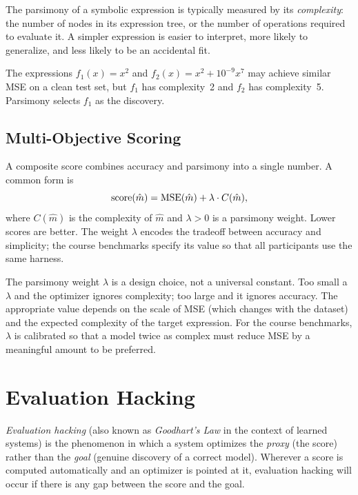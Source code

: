 The parsimony of a symbolic expression is typically measured by its \emph{complexity}: the number of nodes in its expression tree, or the number of operations required to evaluate it.
A simpler expression is easier to interpret, more likely to generalize, and less likely to be an accidental fit.

\begin{example}
The expressions $f_1(x) = x^2$ and $f_2(x) = x^2 + 10^{-9} x^7$ may achieve similar MSE on a clean test set, but $f_1$ has complexity~2 and $f_2$ has complexity~5.
Parsimony selects $f_1$ as the discovery.
\end{example}

\subsection{Multi-Objective Scoring}
\label{subsection:MultiObjectiveScoring}

A composite score combines accuracy and parsimony into a single number.
A common form is
\begin{equation}
\mathrm{score}(\hat{m}) = \mathrm{MSE}(\hat{m}) + \lambda \cdot C(\hat{m}) ,
\label{equation:CompositeScore}
\end{equation}
where $C(\hat{m})$ is the complexity of $\hat{m}$ and $\lambda > 0$ is a parsimony weight.
Lower scores are better.
The weight $\lambda$ encodes the tradeoff between accuracy and simplicity; the course benchmarks specify its value so that all participants use the same harness.

\begin{remark}
The parsimony weight $\lambda$ is a design choice, not a universal constant.
Too small a $\lambda$ and the optimizer ignores complexity; too large and it ignores accuracy.
The appropriate value depends on the scale of MSE (which changes with the dataset) and the expected complexity of the target expression.
For the course benchmarks, $\lambda$ is calibrated so that a model twice as complex must reduce MSE by a meaningful amount to be preferred.
\end{remark}

\section{Evaluation Hacking}
\label{section:EvalHacking}

\emph{Evaluation hacking} (also known as \emph{Goodhart's Law} in the context of learned systems) is the phenomenon in which a system optimizes the \emph{proxy} (the score) rather than the \emph{goal} (genuine discovery of a correct model).
Wherever a score is computed automatically and an optimizer is pointed at it, evaluation hacking will occur if there is any gap between the score and the goal.

